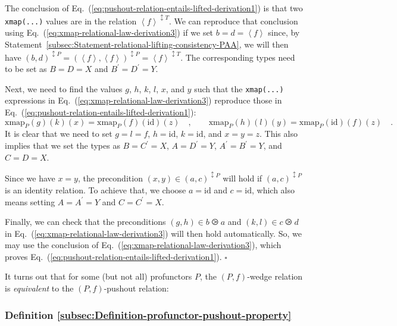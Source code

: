 The conclusion of Eq.~(\ref{eq:pushout-relation-entails-lifted-derivation1})
is that two \lstinline!xmap(...)! values are in the relation $\left<f\right>^{\updownarrow T}$.
We can reproduce that conclusion using Eq.~(\ref{eq:xmap-relational-law-derivation3})
if we set $b=d=\left<f\right>$ since, by Statement~\ref{subsec:Statement-relational-lifting-consistency-PAA},
we will then have $(b,d)^{\updownarrow P}=(\left<f\right>,\left<f\right>)^{\updownarrow P}=\left<f\right>^{\updownarrow T}$.
The corresponding types need to be set as $B=D=X$ and $B^{\prime}=D^{\prime}=Y$.

Next, we need to find the values $g$, $h$, $k$, $l$, $x$, and
$y$ such that the \lstinline!xmap(...)! expressions in Eq.~(\ref{eq:xmap-relational-law-derivation3})
reproduce those in Eq.~(\ref{eq:pushout-relation-entails-lifted-derivation1}):
\[
\text{xmap}_{P}(g)(k)(x)=\text{xmap}_{P}(f)(\text{id})(z)\quad,\quad\quad\text{xmap}_{P}(h)(l)(y)=\text{xmap}_{P}(\text{id})(f)(z)\quad.
\]
It is clear that we need to set $g=l=f$, $h=\text{id}$, $k=\text{id}$,
and $x=y=z$. This also implies that we set the types as $B=C^{\prime}=X$,
$A=D^{\prime}=Y$, $A^{\prime}=B^{\prime}=Y$, and $C=D=X$.

Since we have $x=y$, the precondition $(x,y)\in(a,c)^{\updownarrow P}$
will hold if $(a,c)^{\updownarrow P}$ is an identity relation. To
achieve that, we choose $a=\text{id}$ and $c=\text{id}$, which also
means setting $A=A^{\prime}=Y$ and $C=C^{\prime}=X$. 

Finally, we can check that the preconditions $(g,h)\in b\ogreaterthan a$
and $(k,l)\in c\ogreaterthan d$ in Eq.~(\ref{eq:xmap-relational-law-derivation3})
will then hold automatically. So, we may use the conclusion of Eq.~(\ref{eq:xmap-relational-law-derivation3}),
which proves Eq.~(\ref{eq:pushout-relation-entails-lifted-derivation1}).
$\square$

It turns out that for some (but not all) profunctors $P$, the $\left(P,f\right)$-wedge
relation is \emph{equivalent} to the $\left(P,f\right)$-pushout relation:

\subsubsection{Definition \label{subsec:Definition-profunctor-pushout-property}\ref{subsec:Definition-profunctor-pushout-property}}


